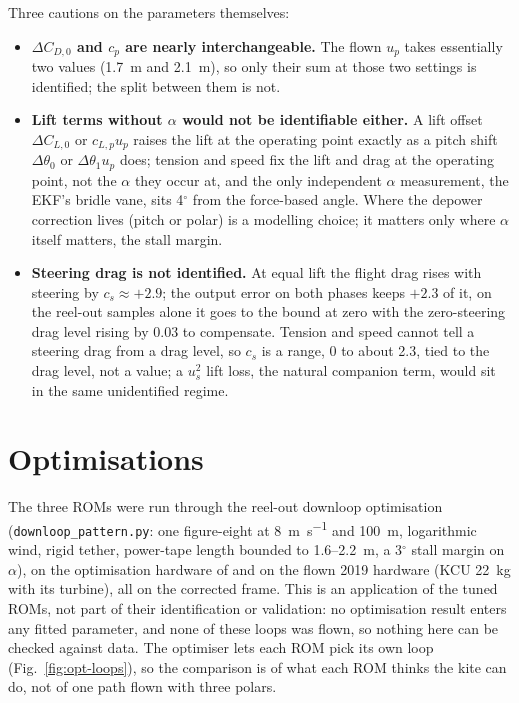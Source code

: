 \documentclass[11pt,a4paper]{article}
\newcommand{\code}[1]{\texttt{\small #1}}
\begin{document}
Three cautions on the parameters themselves:
\begin{itemize}
  \item \textbf{$\Delta C_{D,0}$ and $c_p$ are nearly interchangeable.} The
        flown $u_p$ takes essentially two values (\SI{1.7}{\metre} and
        \SI{2.1}{\metre}), so only their sum at those two settings is
        identified; the split between them is not.
  \item \textbf{Lift terms without $\alpha$ would not be identifiable
        either.} A lift offset $\Delta C_{L,0}$ or $c_{L,p}u_p$ raises the lift
        at the operating point exactly as a pitch shift $\Delta\theta_0$ or
        $\Delta\theta_1u_p$ does; tension and speed fix the lift and drag at
        the operating point, not the $\alpha$ they occur at, and the only
        independent $\alpha$ measurement, the EKF's bridle vane, sits
        4$^\circ$ from the force-based angle. Where the depower correction
        lives (pitch or polar) is a modelling choice; it matters only where
        $\alpha$ itself matters, the stall margin.
  \item \textbf{Steering drag is not identified.} At equal lift the flight
        drag rises with steering by $c_s\approx+2.9$; the output error on both
        phases keeps $+2.3$ of it, on the reel-out samples alone it goes to
        the bound at zero with the zero-steering drag level rising by $0.03$
        to compensate. Tension and speed cannot tell a steering drag from a
        drag level, so $c_s$ is a range, 0 to about 2.3, tied to the drag
        level, not a value; a $u_s^2$ lift loss, the natural companion term,
        would sit in the same unidentified regime.
\end{itemize}

\section{Optimisations}
\label{sec:optimisations}
The three ROMs were run through the reel-out downloop optimisation
(\code{downloop\_pattern.py}: one figure-eight at \SI{8}{\metre\per\second}
and \SI{100}{\metre}, logarithmic wind, rigid tether, power-tape length
bounded to 1.6--\SI{2.2}{\metre}, a 3$^\circ$ stall margin on $\alpha$), on
the optimisation hardware of  and on the flown 2019
hardware (KCU \SI{22}{\kilogram} with its turbine), all on the corrected
frame. This is an application of the tuned ROMs, not part of their
identification or validation: no optimisation result enters any fitted
parameter, and none of these loops was flown, so nothing here can be checked
against data. The optimiser lets each ROM pick its own loop
(Fig.~\ref{fig:opt-loops}), so the comparison is of what each ROM thinks the
kite can do, not of one path flown with three polars.
\end{document}
